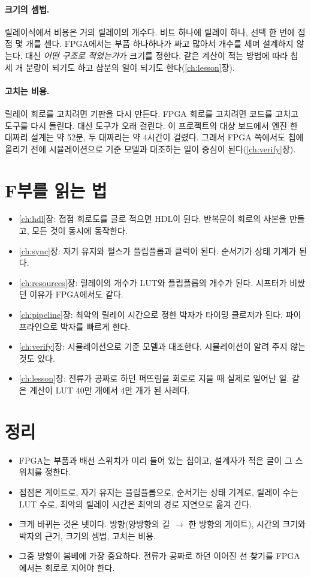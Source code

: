 \paragraph{크기의 셈법.} 릴레이식에서 비용은 거의 릴레이의 개수다. 비트 하나에 릴레이 하나, 선택 한 번에 접점 몇 개를
센다. FPGA에서는 부품 하나하나가 싸고 많아서 개수를 세며 설계하지 않는다. 대신 \emph{어떤 구조로 적었는가}가 크기를
정한다. 같은 계산이 적는 방법에 따라 칩 세 개 분량이 되기도 하고 삼분의 일이 되기도 한다(\ref{ch:lesson}장).

\paragraph{고치는 비용.} 릴레이 회로를 고치려면 기판을 다시 만든다. FPGA 회로를 고치려면 코드를 고치고 도구를 다시
돌린다. 대신 도구가 오래 걸린다. 이 프로젝트의 대상 보드에서 엔진 한 대짜리 설계는 약 52분, 두 대짜리는 약 4시간이
걸렸다. 그래서 FPGA 쪽에서도 칩에 올리기 전에 시뮬레이션으로 기준 모델과 대조하는 일이 중심이 된다(\ref{ch:verify}장).

\section{F부를 읽는 법}\label{sec:rf-read}

\begin{itemize}
\item \ref{ch:hdl}장: 접점 회로도를 글로 적으면 HDL이 된다. 반복문이 회로의 사본을 만들고, 모든 것이 동시에 동작한다.
\item \ref{ch:sync}장: 자기 유지와  펄스가 플립플롭과 클럭이 된다. 순서기가 상태 기계가 된다.
\item \ref{ch:resources}장: 릴레이의 개수가 LUT와 플립플롭의 개수가 된다. 시프터가 비쌌던 이유가 FPGA에서도 같다.
\item \ref{ch:pipeline}장: 최악의 릴레이 시간으로 정한 박자가 타이밍 클로저가 된다. 파이프라인으로 박자를 빠르게 한다.
\item \ref{ch:verify}장: 시뮬레이션으로 기준 모델과 대조한다. 시뮬레이션이 알려 주지 않는 것도 있다.
\item \ref{ch:lesson}장: 전류가 공짜로 하던 퍼뜨림을 회로로 지을 때 실제로 일어난 일. 같은 계산이 LUT 40만 개에서 4만 개가 된 사례다.
\end{itemize}

\section{정리}

\begin{itemize}
\item FPGA는 부품과 배선 스위치가 미리 들어 있는 칩이고, 설계자가 적은 글이 그 스위치를 정한다.
\item 접점은 게이트로, 자기 유지는 플립플롭으로, 순서기는 상태 기계로, 릴레이 수는 LUT 수로, 최악의 릴레이 시간은
최악의 경로 지연으로 옮겨 간다.
\item 크게 바뀌는 것은 넷이다. 방향(양방향의 길 $\to$ 한 방향의 게이트), 시간의 크기와 박자의 근거, 크기의 셈법, 고치는 비용.
\item 그중 방향이 봄베에 가장 중요하다. 전류가 공짜로 하던 이어진 선 찾기를 FPGA에서는 회로로 지어야 한다.
\end{itemize}
